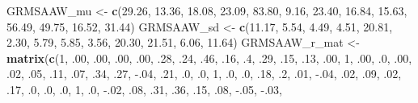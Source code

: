 \documentclass[
  english,
]{book}
\newenvironment{Shaded}{\begin{snugshade}}{\end{snugshade}}
\newcommand{\DecValTok}[1]{\textcolor[rgb]{0.00,0.00,0.81}{#1}}
\newcommand{\FloatTok}[1]{\textcolor[rgb]{0.00,0.00,0.81}{#1}}
\newcommand{\KeywordTok}[1]{\textcolor[rgb]{0.13,0.29,0.53}{\textbf{#1}}}
\newcommand{\NormalTok}[1]{#1}
\newcommand{\StringTok}[1]{\textcolor[rgb]{0.31,0.60,0.02}{#1}}
\begin{document}
\begin{Shaded}
\begin{Highlighting}[]
\NormalTok{GRMSAAW_mu <-}\StringTok{ }\KeywordTok{c}\NormalTok{(}\FloatTok{29.26}\NormalTok{, }\FloatTok{13.36}\NormalTok{, }\FloatTok{18.08}\NormalTok{, }\FloatTok{23.09}\NormalTok{, }\FloatTok{83.80}\NormalTok{, }\FloatTok{9.16}\NormalTok{, }\FloatTok{23.40}\NormalTok{, }\FloatTok{16.84}\NormalTok{, }\FloatTok{15.63}\NormalTok{, }\FloatTok{56.49}\NormalTok{, }\FloatTok{49.75}\NormalTok{, }\FloatTok{16.52}\NormalTok{, }\FloatTok{31.44}\NormalTok{)}
\NormalTok{GRMSAAW_sd <-}\StringTok{ }\KeywordTok{c}\NormalTok{(}\FloatTok{11.17}\NormalTok{, }\FloatTok{5.54}\NormalTok{, }\FloatTok{4.49}\NormalTok{, }\FloatTok{4.51}\NormalTok{, }\FloatTok{20.81}\NormalTok{, }\FloatTok{2.30}\NormalTok{, }\FloatTok{5.79}\NormalTok{, }\FloatTok{5.85}\NormalTok{, }\FloatTok{3.56}\NormalTok{, }\FloatTok{20.30}\NormalTok{, }\FloatTok{21.51}\NormalTok{, }\FloatTok{6.06}\NormalTok{, }\FloatTok{11.64}\NormalTok{)}
\NormalTok{GRMSAAW_r_mat <-}\StringTok{ }\KeywordTok{matrix}\NormalTok{(}\KeywordTok{c}\NormalTok{(}\DecValTok{1}\NormalTok{, }\FloatTok{.00}\NormalTok{, }\FloatTok{.00}\NormalTok{, }\FloatTok{.00}\NormalTok{, }\FloatTok{.00}\NormalTok{, }\FloatTok{.28}\NormalTok{, }\FloatTok{.24}\NormalTok{, }\FloatTok{.46}\NormalTok{, }\FloatTok{.16}\NormalTok{, }\FloatTok{.4}\NormalTok{, }\FloatTok{.29}\NormalTok{, }\FloatTok{.15}\NormalTok{, }\FloatTok{.13}\NormalTok{,}
                          \FloatTok{.00}\NormalTok{, }\DecValTok{1}\NormalTok{, }\FloatTok{.00}\NormalTok{, }\FloatTok{.0}\NormalTok{, }\FloatTok{.00}\NormalTok{, }\FloatTok{.02}\NormalTok{, }\FloatTok{.05}\NormalTok{, }\FloatTok{.11}\NormalTok{, }\FloatTok{.07}\NormalTok{, }\FloatTok{.34}\NormalTok{, }\FloatTok{.27}\NormalTok{, }\FloatTok{-.04}\NormalTok{, }\FloatTok{.21}\NormalTok{,}
                          \FloatTok{.0}\NormalTok{, }\FloatTok{.0}\NormalTok{, }\DecValTok{1}\NormalTok{, }\FloatTok{.0}\NormalTok{, }\FloatTok{.0}\NormalTok{, }\FloatTok{.18}\NormalTok{, }\FloatTok{.2}\NormalTok{, }\FloatTok{.01}\NormalTok{, }\FloatTok{-.04}\NormalTok{, }\FloatTok{.02}\NormalTok{, }\FloatTok{.09}\NormalTok{, }\FloatTok{.02}\NormalTok{, }\FloatTok{.17}\NormalTok{,}
                          \FloatTok{.0}\NormalTok{, }\FloatTok{.0}\NormalTok{, }\FloatTok{.0}\NormalTok{, }\DecValTok{1}\NormalTok{, }\FloatTok{.0}\NormalTok{, }\FloatTok{-.02}\NormalTok{, }\FloatTok{.08}\NormalTok{, }\FloatTok{.31}\NormalTok{, }\FloatTok{.36}\NormalTok{, }\FloatTok{.15}\NormalTok{, }\FloatTok{.08}\NormalTok{, }\FloatTok{-.05}\NormalTok{, }\FloatTok{-.03}\NormalTok{,}

\end{Highlighting}
\end{Shaded}
\end{document}
